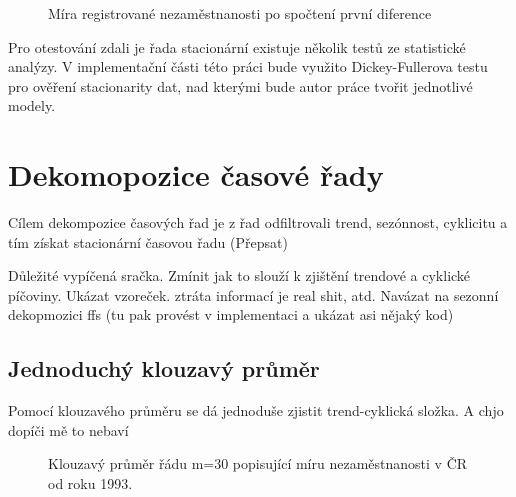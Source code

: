 \documentclass[FM,BP,fonts]{tulthesis}
\begin{document}
\begin{figure}[htbp]
	\centering
	\caption{Míra registrované nezaměstnanosti po spočtení první diference }
	\label{fig:nezamestnanost_diff}
\end{figure}

Pro otestování zdali je řada stacionární existuje několik testů ze statistické analýzy. V implementační části této práci bude využito Dickey-Fullerova testu pro ověření stacionarity dat, nad kterými bude autor práce tvořit jednotlivé modely. 


\section{Dekomopozice časové řady}
Cílem dekompozice časových řad je z řad odfiltrovali trend, sezónnost, cyklicitu a tím získat stacionární časovou řadu (Přepsat)

Důležité vypíčená sračka. Zmínit jak to slouží k zjištění trendové a cyklické píčoviny. Ukázat vzoreček. ztráta informací je real shit, atd.
Navázat na sezonní dekopmozici ffs (tu pak provést v implementaci a ukázat asi nějaký kod)
 
\subsection{Jednoduchý klouzavý průměr}
Pomocí klouzavého průměru se dá
jednoduše zjistit trend-cyklická složka. A chjo dopíči mě to nebaví
 
\begin{figure}[htbp]
	\centering
	\caption{Klouzavý průměr řádu m=30 popisující míru nezaměstnanosti v ČR od roku 1993. }
	\label{fig:my_graph}
\end{figure}
\end{document}
